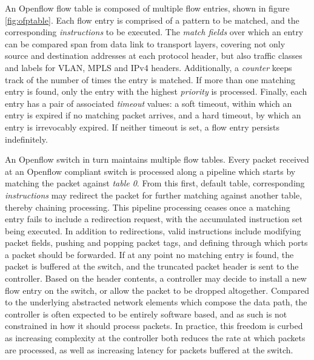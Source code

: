 An Openflow flow table is composed of multiple flow entries, shown in figure \ref{fig:ofptable}.
Each flow entry is comprised of a pattern to be matched, and the corresponding \emph{instructions} to be executed. 
The \emph{match fields} over which an entry can be compared span from data link to transport layers, covering not only source and destination addresses at each protocol header, but also traffic classes and labels for \ac{VLAN}, \ac{MPLS} and \ac{IPv4} headers.
Additionally, a \emph{counter} keeps track of the number of times the entry is matched.
If more than one matching entry is found, only the entry with the highest \emph{priority} is processed.
Finally, each entry has a pair of associated \emph{timeout} values: a soft timeout, within which an entry is expired if no matching packet arrives, and a hard timeout, by which an entry is irrevocably expired.
If neither timeout is set, a flow entry persists indefinitely.

An Openflow switch in turn maintains multiple flow tables.
Every packet received at an Openflow compliant switch is processed along a pipeline which starts by matching the packet against \emph{table 0}.
From this first, default table, corresponding \emph{instructions} may redirect the packet for further matching against another table, thereby chaining processing.
This pipeline processing ceases once a matching entry fails to include a redirection request, with the accumulated instruction set being executed.
In addition to redirections, valid instructions include modifying packet fields, pushing and popping packet tags, and defining through which ports a packet should be forwarded.
If at any point no matching entry is found, the packet is buffered at the switch, and the truncated packet header is sent to the controller.
Based on the header contents, a controller may decide to install a new flow entry on the switch, or allow the packet to be dropped altogether.
Compared to the underlying abstracted network elements which compose the data path, the controller is often expected to be entirely software based, and as such is not constrained in how it should process packets.
In practice, this freedom is curbed as increasing complexity at the controller both reduces the rate at which packets are processed, as well as increasing latency for packets buffered at the switch.

